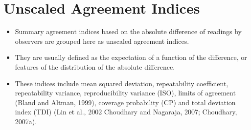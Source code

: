 \documentclass[Chap3bmain.tex]{subfiles}
\begin{document}
\section{Unscaled Agreement Indices}
\begin{itemize}
\item Summary agreement indices based on the absolute difference of readings by observers are
grouped here as unscaled agreement indices. 
\item They are usually defined as the expectation
of a function of the difference, or features of the distribution of the absolute difference.

\item
These indices include mean squared deviation, repeatability coefficient, repeatability variance,
reproducibility variance (ISO), limits of agreement (Bland and Altman, 1999), coverage
probability (CP) and total deviation index (TDI) (Lin et al., 2002 Choudhary and Nagaraja,
2007; Choudhary, 2007a).
\end{itemize}
\end{document}

